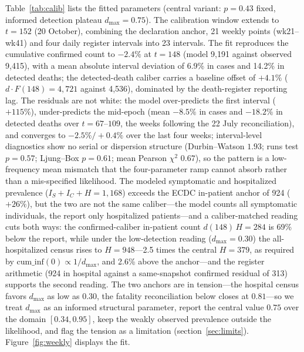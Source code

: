 \documentclass[preprint,12pt,numbers]{elsarticle}
\begin{document}
Table~\ref{tab:calib} lists the fitted parameters (central variant:
$p=0.43$ fixed, informed detection plateau $d_{\max}=0.75$). The
calibration window extends to $t=152$ (20 October), combining the
declaration anchor, 21 weekly points (wk21--wk41) and four daily
register intervals into 23 intervals. The fit reproduces the cumulative
confirmed count to $-2.4\%$ at $t=148$ (model 9{,}191 against observed
9,415), with a mean absolute interval deviation of 6.9\% in cases and
14.2\% in detected deaths; the detected-death caliber carries a baseline
offset of $+4.1\%$ ($d\cdot F(148)=4{,}721$ against 4,536), dominated by
the death-register reporting lag. The residuals are not white: the model
over-predicts the first interval ($+115\%$), under-predicts the
mid-epoch (mean $-8.5\%$ in cases and $-18.2\%$ in detected deaths over
$t=67$--$109$, the weeks following the 22 July reconciliation), and
converges to $-2.5\%/+0.4\%$ over the last four weeks; interval-level
diagnostics show no serial or dispersion structure (Durbin--Watson
$1.93$; runs test $p=0.57$; Ljung--Box $p=0.61$; mean Pearson $\chi^2$
$0.67$), so the pattern is a low-frequency mean mismatch that the
four-parameter ramp cannot absorb rather than a mis-specified
likelihood. The modeled symptomatic and hospitalized prevalence
($I_S+I_C+H=1{,}168$) exceeds the ECDC in-patient anchor of 924
($+26\%$), but the two are not the same caliber---the model counts all
symptomatic individuals, the report only hospitalized patients---and a
caliber-matched reading cuts both ways: the confirmed-caliber in-patient
count $d(148)\,H=284$ is 69\% below the report, while under the
low-detection reading ($d_{\max}=0.30$) the all-hospitalized census
rises to $H=948$---2.5 times the central $H=379$, as required by
$\mathrm{cum\_inf}(0)\propto 1/d_{\max}$, and 2.6\% above the
anchor---and the register arithmetic (924 in hospital against a
same-snapshot confirmed residual of 313) supports the second reading.
The two anchors are in tension---the hospital census favors $d_{\max}$
as low as $0.30$, the fatality reconciliation below closes at
$0.81$---so we treat $d_{\max}$ as an informed structural parameter,
report the central value $0.75$ over the domain $[0.34,0.95]$, keep the
weakly observed prevalence outside the likelihood, and flag the tension
as a limitation (section~\ref{sec:limits}). Figure~\ref{fig:weekly}
displays the fit.
\end{document}
